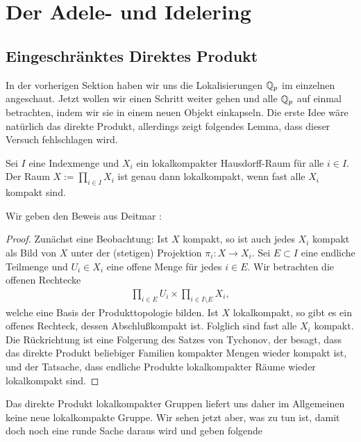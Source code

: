 \section{Der Adele- und Idelering}
	
\subsection{Eingeschränktes Direktes Produkt}\label{kapitel:RDP}
		In der vorherigen Sektion haben wir uns die Lokalisierungen ${\mathbb{Q}_p}$ im einzelnen angeschaut. 
		Jetzt wollen wir einen Schritt weiter gehen und alle ${\mathbb{Q}_p}$ auf einmal betrachten, indem wir sie in einem neuen Objekt einkapseln. 
		Die erste Idee wäre natürlich das direkte Produkt, allerdings zeigt folgendes Lemma, dass dieser Versuch fehlschlagen wird.
		\begin{lemma}\label{Lemma:lokalkompaktProd}
			Sei $I$ eine Indexmenge und $X_i$ ein lokalkompakter Hausdorff-Raum für alle $i \in I$. Der Raum $X:=\prod_{i \in I} X_i$ ist genau dann lokalkompakt, wenn fast alle $X_i$ kompakt sind.
		\end{lemma}
		Wir geben den Beweis aus Deitmar \cite{deitmar2010}:
		\begin{proof}
			Zunächst eine Beobachtung: Ist $X$ kompakt, so ist auch jedes $X_i$ kompakt als Bild von $X$ unter der (stetigen) Projektion $\pi_i:X \to X_i$.
			Sei $E \subset I$ eine endliche Teilmenge und $U_i \in X_i$ eine offene Menge für jedes $i \in E$. Wir betrachten die offenen Rechtecke
			\begin{align*}
				\prod_{i \in E} U_i \times \prod_{i \in I\setminus E} X_i,
			\end{align*}
			welche eine Basis der Produkttopologie bilden. Ist $X$ lokalkompakt, so gibt es ein offenes Rechteck, dessen Abschlu\ss kompakt ist. 
			Folglich sind fast alle $X_i$ kompakt. 
			Die Rückrichtung ist eine Folgerung des Satzes von Tychonov, der besagt, dass das direkte Produkt beliebiger Familien kompakter Mengen wieder kompakt ist, und der Tatsache, dass endliche Produkte lokalkompakter Räume wieder lokalkompakt sind.
		\end{proof}
		Das direkte Produkt lokalkompakter Gruppen liefert uns daher im Allgemeinen keine neue lokalkompakte Gruppe. 
		Wir sehen jetzt aber, was zu tun ist, damit doch noch eine runde Sache daraus wird und geben folgende
